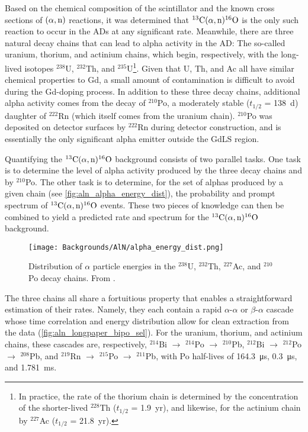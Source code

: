 \documentclass[../thesis.tex]{subfiles}
\begin{document}
Based on the chemical composition of the scintillator and the known cross sections of $(\alpha,\mathrm{n})$ reactions, it was determined that $^{13}\mathrm{C}(\alpha, \mathrm{n})^{16}\mathrm{O}$ is the only such reaction to occur in the ADs at any significant rate. Meanwhile, there are three natural decay chains that can lead to alpha activity in the AD: The so-called uranium, thorium, and actinium chains, which begin, respectively, with the long-lived isotopes $^{238}$U, $^{232}$Th, and $^{235}$U\footnote{In practice, the rate of the thorium chain is determined by the concentration of the shorter-lived $^{228}$Th ($t_{1/2}$ = 1.9~yr), and likewise, for the actinium chain by $^{227}$Ac ($t_{1/2}$ = 21.8~yr).}. Given that U, Th, and Ac all have similar chemical properties to Gd, a small amount of contamination is difficult to avoid during the Gd-doping process. In addition to these three decay chains, additional alpha activity comes from the decay of $^{210}$Po, a moderately stable ($t_{1/2}$ = 138~d) daughter of $^{222}$Rn (which itself comes from the uranium chain). $^{210}$Po was deposited on detector surfaces by $^{222}$Rn during detector construction, and is essentially the only significant alpha emitter outside the GdLS region.

Quantifying the $^{13}\mathrm{C}(\alpha, \mathrm{n})^{16}\mathrm{O}$ background consists of two parallel tasks. One task is to determine the level of alpha activity produced by the three decay chains and by $^{210}$Po. The other task is to determine, for the set of alphas produced by a given chain (see \autoref{fig:aln_alpha_energy_dist}), the probability and prompt spectrum of $^{13}\mathrm{C}(\alpha, \mathrm{n})^{16}\mathrm{O}$ events. These two pieces of knowledge can then be combined to yield a predicted rate and spectrum for the $^{13}\mathrm{C}(\alpha, \mathrm{n})^{16}\mathrm{O}$ background.

\begin{figure}[ht]
  \texttt{[image: Backgrounds/AlN/alpha\_energy\_dist.png]}
  \caption{Distribution of $\alpha$ particle energies in the $^{238}$U, $^{232}$Th, $^{227}$Ac, and $^{210}$Po decay chains. From \cite{Zhao_2014}.}
  \label{fig:aln_alpha_energy_dist}
\end{figure}

The three chains all share a fortuitious property that enables a straightforward estimation of their rates. Namely, they each contain a rapid $\alpha$-$\alpha$ or $\beta$-$\alpha$ cascade whose time correlation and energy distribution allow for clean extraction from the data (\autoref{fig:aln_longpaper_bipo_sel}). For the uranium, thorium, and actinium chains, these cascades are, respectively, $^{214}$Bi $\to$ $^{214}$Po $\to$ $^{210}$Pb, $^{212}$Bi $\to$ $^{212}$Po $\to$ $^{208}$Pb, and $^{219}$Rn $\to$ $^{215}$Po $\to$ $^{211}$Pb, with Po half-lives of \SI{164.3}{\micro s}, \SI{0.3}{\micro s}, and \SI{1.781}{ms}.
\end{document}
